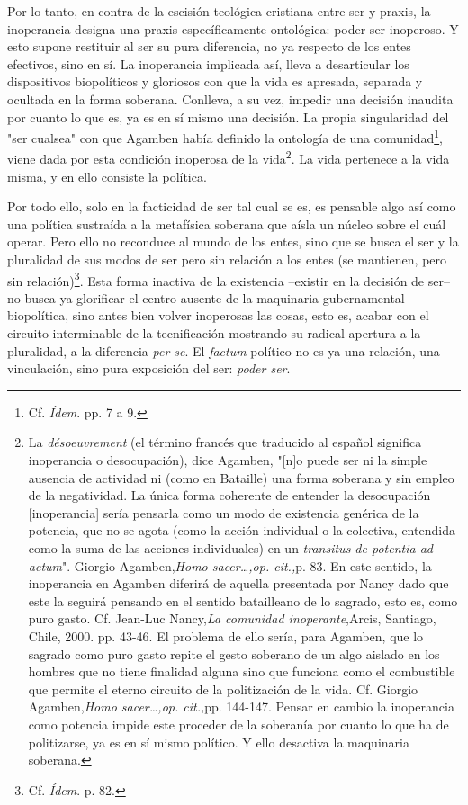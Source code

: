 Por lo tanto, en contra de la escisión teológica cristiana entre ser y
praxis, la inoperancia designa una praxis específicamente ontológica:
poder ser inoperoso. Y esto supone restituir al ser su pura diferencia,
no ya respecto de los entes efectivos, sino en sí. La inoperancia
implicada así, lleva a desarticular los dispositivos biopolíticos y
gloriosos con que la vida es apresada, separada y ocultada en la forma
soberana. Conlleva, a su vez, impedir una decisión inaudita por cuanto
lo que es, ya es en sí mismo una decisión. La propia singularidad del
"ser cualsea" con que Agamben había definido la ontología de una
comunidad\footnote{Cf. \emph{Ídem}. pp. 7 a 9.}, viene dada por esta
condición inoperosa de la vida\footnote{La \emph{désoeuvrement} (el
  término francés que traducido al español significa inoperancia o
  desocupación), dice Agamben, "{[}n{]}o puede ser ni la simple ausencia
  de actividad ni (como en Bataille) una forma soberana y sin empleo de
  la negatividad. La única forma coherente de entender la desocupación
  {[}inoperancia{]} sería pensarla como un modo de existencia genérica
  de la potencia, que no se agota (como la acción individual o la
  colectiva, entendida como la suma de las acciones individuales) en un
  \emph{transitus de potentia ad actum}". Giorgio Agamben,\emph{Homo
  sacer\ldots,op. cit.,}p. 83. En este sentido, la inoperancia en
  Agamben diferirá de aquella presentada por Nancy dado que este la
  seguirá pensando en el sentido batailleano de lo sagrado, esto es,
  como puro gasto. Cf. Jean-Luc Nancy,\emph{La comunidad
  inoperante},Arcis, Santiago, Chile, 2000. pp. 43-46. El problema de
  ello sería, para Agamben, que lo sagrado como puro gasto repite el
  gesto soberano de un algo aislado en los hombres que no tiene
  finalidad alguna sino que funciona como el combustible que permite el
  eterno circuito de la politización de la vida. Cf. Giorgio
  Agamben,\emph{Homo sacer\ldots,op. cit.,}pp. 144-147. Pensar en cambio
  la inoperancia como potencia impide este proceder de la soberanía por
  cuanto lo que ha de politizarse, ya es en sí mismo político. Y ello
  desactiva la maquinaria soberana.}. La vida pertenece a la vida misma,
y en ello consiste la política.

Por todo ello, solo en la facticidad de ser tal cual se es, es pensable
algo así como una política sustraída a la metafísica soberana que aísla
un núcleo sobre el cuál operar. Pero ello no reconduce al mundo de los
entes, sino que se busca el ser y la pluralidad de sus modos de ser pero
sin relación a los entes (se mantienen, pero sin relación)\footnote{Cf.
  \emph{Ídem}. p. 82.}. Esta forma inactiva de la existencia --existir
en la decisión de ser-- no busca ya glorificar el centro ausente de la
maquinaria gubernamental biopolítica, sino antes bien volver inoperosas
las cosas, esto es, acabar con el circuito interminable de la
tecnificación mostrando su radical apertura a la pluralidad, a la
diferencia \emph{per se}. El \emph{factum} político no es ya una
relación, una vinculación, sino pura exposición del ser: \emph{poder
ser}.

